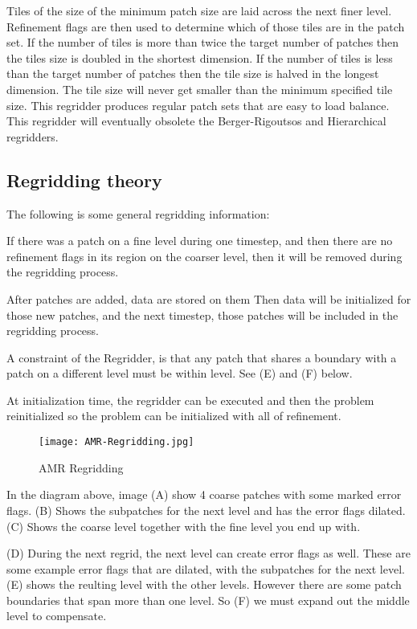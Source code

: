 Tiles of the size of the minimum patch size are laid across the next
finer level. Refinement flags are then used to determine which of
those tiles are in the patch set. If the number of tiles is more than
twice the target number of patches then the tiles size is doubled in
the shortest dimension. If the number of tiles is less than the target
number of patches then the tile size is halved in the longest
dimension. The tile size will never get smaller than the minimum
specified tile size. This regridder produces regular patch sets that
are easy to load balance. This regridder will eventually obsolete the
Berger-Rigoutsos and Hierarchical regridders.  

\subsection{Regridding theory}
The following is some general regridding information:

If there was a patch on a fine level during one timestep, and then
there are no refinement flags in its region on the coarser level, then
it will be removed during the regridding process.

After patches are added, data are stored on them Then data will be
initialized for those new patches, and the next timestep, those
patches will be included in the regridding process.

A constraint of the Regridder, is that any patch that shares a
boundary with a patch on a different level must be within level. See
(E) and (F) below.

At initialization time, the regridder can be executed and then the
problem reinitialized so the problem can be initialized with all
 of refinement.
\begin{figure}[htb]
  \centering
  \texttt{[image: AMR-Regridding.jpg]}
  \caption{AMR Regridding}
  \label{fig:amr1}
\end{figure}

In the diagram above, image (A) show 4 coarse patches with some marked
error flags. (B) Shows the subpatches for the next level and has the
error flags dilated. (C) Shows the coarse level together with the fine
level you end up with.

(D) During the next regrid, the next level can create error flags as
well. These are some example error flags that are dilated, with the
subpatches for the next level. (E) shows the reulting level with the
other levels. However there are some patch boundaries that span more
than one level. So (F) we must expand out the middle level to
compensate.

